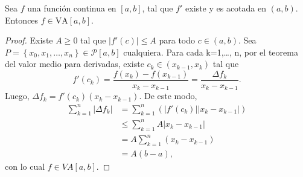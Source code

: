 \begin{lemma}

Sea $f$ una función continua en $\left[a,b\right]$, tal que $f'$ existe y es acotada en $\left(a,b\right)$. Entonces $f\in \text{VA}\left[a,b\right]$.

\end{lemma}

\begin{proof}

Existe $A\geq 0$ tal que $|f'\left(c\right)| \leq A$ para todo $c \in \left(a,b\right)$. Sea $P= \left\lbrace x_0, x_1, \dots, x_n \right\rbrace \in \mathcal{P}\left[a,b\right]$ cualquiera. Para cada k=1,\dots, n, por el teorema del valor medio para derivadas, existe $c_k\in \left(x_{k-1},x_k\right)$ tal que 
\begin{equation*}
  f'\left(c_k\right)=\frac{f\left(x_k\right)-f\left(x_{k-1}\right)}{x_k-x_{k-1}}=\frac{\Delta f_k}{x_k-x_{k-1}}.
\end{equation*}
Luego, $\Delta f_k = f'\left(c_k\right)\left(x_k-x_{k-1}\right)$. De este modo,
\begin{align*}
  \sum_{k=1}^{n}|\Delta f_{k}|&=\sum_{k=1}^{n}\left(|f'\left(c_k\right)||x_k-x_{k-1}|\right)\\
  &\leq \sum_{k=1}^{n}A|x_k-x_{k-1}|\\
  &=A\sum_{k=1}^{n}\left(x_k-x_{k-1}\right)\\
  &=A\left(b-a\right),
\end{align*}
con lo cual $f\in \textit{VA}\left[a,b\right]$.

\end{proof}
